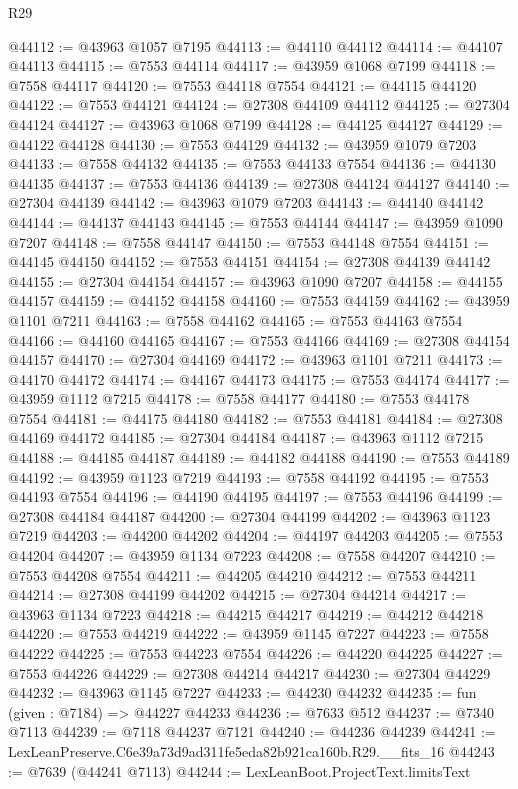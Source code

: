 \begin{lexlean}{R29}
\begin{coremodule}
@44112 := @43963 @1057 @7195
@44113 := @44110 @44112
@44114 := @44107 @44113
@44115 := @7553 @44114
@44117 := @43959 @1068 @7199
@44118 := @7558 @44117
@44120 := @7553 @44118 @7554
@44121 := @44115 @44120
@44122 := @7553 @44121
@44124 := @27308 @44109 @44112
@44125 := @27304 @44124
@44127 := @43963 @1068 @7199
@44128 := @44125 @44127
@44129 := @44122 @44128
@44130 := @7553 @44129
@44132 := @43959 @1079 @7203
@44133 := @7558 @44132
@44135 := @7553 @44133 @7554
@44136 := @44130 @44135
@44137 := @7553 @44136
@44139 := @27308 @44124 @44127
@44140 := @27304 @44139
@44142 := @43963 @1079 @7203
@44143 := @44140 @44142
@44144 := @44137 @44143
@44145 := @7553 @44144
@44147 := @43959 @1090 @7207
@44148 := @7558 @44147
@44150 := @7553 @44148 @7554
@44151 := @44145 @44150
@44152 := @7553 @44151
@44154 := @27308 @44139 @44142
@44155 := @27304 @44154
@44157 := @43963 @1090 @7207
@44158 := @44155 @44157
@44159 := @44152 @44158
@44160 := @7553 @44159
@44162 := @43959 @1101 @7211
@44163 := @7558 @44162
@44165 := @7553 @44163 @7554
@44166 := @44160 @44165
@44167 := @7553 @44166
@44169 := @27308 @44154 @44157
@44170 := @27304 @44169
@44172 := @43963 @1101 @7211
@44173 := @44170 @44172
@44174 := @44167 @44173
@44175 := @7553 @44174
@44177 := @43959 @1112 @7215
@44178 := @7558 @44177
@44180 := @7553 @44178 @7554
@44181 := @44175 @44180
@44182 := @7553 @44181
@44184 := @27308 @44169 @44172
@44185 := @27304 @44184
@44187 := @43963 @1112 @7215
@44188 := @44185 @44187
@44189 := @44182 @44188
@44190 := @7553 @44189
@44192 := @43959 @1123 @7219
@44193 := @7558 @44192
@44195 := @7553 @44193 @7554
@44196 := @44190 @44195
@44197 := @7553 @44196
@44199 := @27308 @44184 @44187
@44200 := @27304 @44199
@44202 := @43963 @1123 @7219
@44203 := @44200 @44202
@44204 := @44197 @44203
@44205 := @7553 @44204
@44207 := @43959 @1134 @7223
@44208 := @7558 @44207
@44210 := @7553 @44208 @7554
@44211 := @44205 @44210
@44212 := @7553 @44211
@44214 := @27308 @44199 @44202
@44215 := @27304 @44214
@44217 := @43963 @1134 @7223
@44218 := @44215 @44217
@44219 := @44212 @44218
@44220 := @7553 @44219
@44222 := @43959 @1145 @7227
@44223 := @7558 @44222
@44225 := @7553 @44223 @7554
@44226 := @44220 @44225
@44227 := @7553 @44226
@44229 := @27308 @44214 @44217
@44230 := @27304 @44229
@44232 := @43963 @1145 @7227
@44233 := @44230 @44232
@44235 := fun (given : @7184) => @44227 @44233
@44236 := @7633 @512
@44237 := @7340 @7113
@44239 := @7118 @44237 @7121
@44240 := @44236 @44239
@44241 := LexLeanPreserve.C6e39a73d9ad311fe5eda82b921ca160b.R29.__fits_16
@44243 := @7639 (@44241 @7113)
@44244 := LexLeanBoot.ProjectText.limitsText

\end{coremodule}
\end{lexlean}
